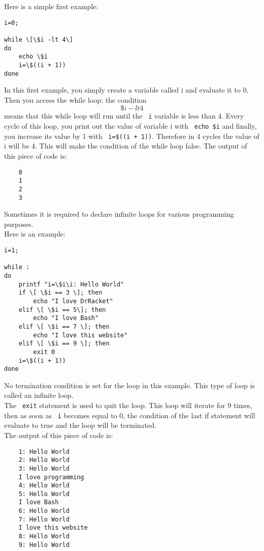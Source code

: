\documentclass[hidelinks,12pt,a4paper,numbers=enddot]{scrartcl}
\begin{document}
Here is a simple first example:
\begin{verbatim}
i=0;

while \[\$i -lt 4\]
do
    echo \$i
    i=\$((i + 1))
done
\end{verbatim}

In this first example, you simply create a variable called i and evaluate it to 0.
Then you access the while loop: the condition \texttt{ \[\$i -lt 4\]} means that this while
loop will run until the \texttt{ i} variable is less than 4.
Every cycle of this loop, you print out the value of variable i with \texttt{ echo \$i}
and finally, you increase its value by 1 with \texttt{ i=\$((i + 1))}.
Therefore in 4 cycles the value of i will be 4. This will make the condition of the while loop false.
The output of this piece of code is:
\begin{verbatim}
    0
    1
    2
    3
 \end{verbatim}





Sometimes it is required to declare infinite loops for various programming purposes. \\
Here is an example:
\begin{verbatim}
i=1;

while :
do
    printf "i=\$i\i: Hello World"
    if \[ \$i == 3 \]; then
        echo "I love DrRacket"
    elif \[ \$i == 5\]; then
        echo "I love Bash"
    elif \[ \$i == 7 \]; then
        echo "I love this website"
    elif \[ \$i == 9 \]; then
        exit 0
    i=\$((i + 1))
done
\end{verbatim}

No termination condition is set for the loop in this example. This type of loop
is called an infinite loop.\\
The \texttt{ exit} statement is used to quit the loop. This loop will
iterate for 9 times, then
as soon as \texttt{ i} becomes equal to 0, the condition of the last if
statement will evaluate to true and the loop will be terminated. \\

The output of this piece of code is:
\begin{verbatim}
    1: Hello World
    2: Hello World
    3: Hello World
    I love programming
    4: Hello World
    5: Hello World
    I love Bash
    6: Hello World
    7: Hello World
    I love this website
    8: Hello World
    9: Hello World
\end{verbatim}
\end{document}
